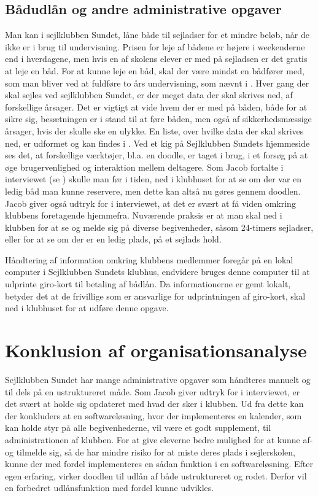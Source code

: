 \subsection{Bådudlån og andre administrative opgaver}\label{subsec:bådudlån}

Man kan i sejlklubben Sundet, låne både til sejladser for et mindre beløb, når de ikke er i brug til undervisning.
Prisen for leje af bådene er højere i weekenderne end i hverdagene, men hvis en af skolens elever er med på sejladsen er
det gratis at leje en båd. For at kunne leje en båd, skal der være mindst en bådfører med, som man bliver ved at
fuldføre to års undervisning, som nævnt i  \citep{Sundet}. Hver gang der skal sejles ved
sejlklubben Sundet, er der meget data der skal skrives ned, af forskellige årsager. Det er vigtigt at vide hvem der er
med på båden, både for at sikre sig, besætningen er i stand til at føre båden, men også af sikkerhedsmæssige årsager,
hvis der skulle ske en ulykke. En liste, over hvilke data der skal skrives ned, er udformet og kan findes i
. Ved et kig på Sejlklubben Sundets hjemmeside \citep{SundetUdlaan} ses det, at forskellige
værktøjer, bl.a. en doodle, er taget i brug, i et forsøg på at øge brugervenlighed og interaktion mellem deltagere. 
Som Jacob fortalte i interviewet (se ) skulle man før i tiden, ned i klubhuset for at se om der var
en ledig båd man kunne reservere, men dette kan altså nu gøres gennem doodlen. Jacob giver også udtryk for i
interviewet, at det er svært at få viden omkring klubbens foretagende hjemmefra. Nuværende praksis er at man skal ned i
klubben for at se og melde sig på diverse begivenheder, såsom 24-timers sejladser, eller for at se om der er en ledig
plads, på et sejlads hold.

Håndtering af information omkring klubbens medlemmer foregår på en lokal computer i Sejlklubben Sundets klubhus,
endvidere bruges denne computer til at udprinte giro-kort til betaling af bådlån. Da informationerne er gemt lokalt,
betyder det at de frivillige som er ansvarlige for udprintningen af giro-kort, skal ned i klubhuset for at udføre denne
opgave.


\section{Konklusion af organisationsanalyse}\label{sec:organisation-konklusion}

Sejlklubben Sundet har mange administrative opgaver som håndteres manuelt og til dels på en ustruktureret måde. Som
Jacob giver udtryk for i interviewet, er det svært at holde sig opdateret med hvad der sker i klubben. Ud fra dette kan
der konkluders at en softwareløsning, hvor der implementeres en kalender, som kan holde styr på alle begivenhederne, vil
være et godt supplement, til administrationen af klubben. For at give eleverne bedre mulighed for at kunne af- og
tilmelde sig, så de har mindre risiko for at miste deres plads i sejlerskolen, kunne der med fordel implementeres en
sådan funktion i en softwareløsning. Efter egen erfaring, virker doodlen til udlån af både ustruktureret og rodet.
Derfor vil en forbedret udlånsfunktion med fordel kunne udvikles.

